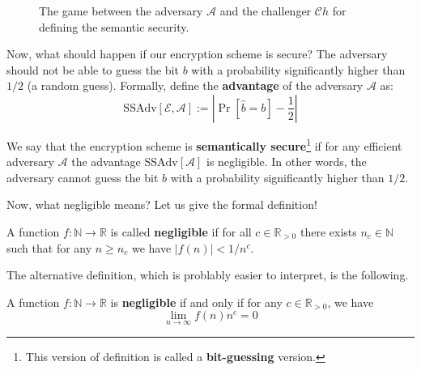 \documentclass[../lecture-notes.tex]{subfiles}
\begin{document}
\begin{figure}

    \caption{The game between the adversary $\mathcal{A}$ and the challenger $\mathcal{C}h$ for defining the semantic security.}
\end{figure}

Now, what should happen if our encryption scheme is secure? The adversary should not be able to guess the bit $b$ with a probability significantly higher than $1/2$ (a random guess). Formally, define the 
\textbf{advantage} of the adversary $\mathcal{A}$ as:
\begin{equation}
    \text{SSAdv}[\mathcal{E}, \mathcal{A}] := \left| \Pr[\hat{b} = b] - \frac{1}{2} \right|
\end{equation}

We say that the encryption scheme is \textbf{semantically secure}\footnote{This version of definition is called a \textbf{bit-guessing} version.} if for any efficient adversary $\mathcal{A}$ the advantage $\text{SSAdv}[\mathcal{A}]$ is negligible. In other words, the adversary cannot guess the bit $b$ with a probability significantly higher than $1/2$.

Now, what negligible means? Let us give the formal definition!

\begin{definition}
    A function $f: \mathbb{N} \to \mathbb{R}$ is called \textbf{negligible} if for all $c \in \mathbb{R}_{>0}$ there exists $n_c \in \mathbb{N}$ such that for any $n \geq n_c$ we have $|f(n)| < 1/n^c$.
\end{definition}

The alternative definition, which is problably easier to interpret, is the following.

\begin{theorem}
    A function $f: \mathbb{N} \to \mathbb{R}$ is \textbf{negligible} if and only if for any $c \in \mathbb{R}_{>0}$, we have
    \begin{equation}
        \lim_{n \to \infty} f(n)n^c = 0
    \end{equation}
\end{theorem}
\end{document}
